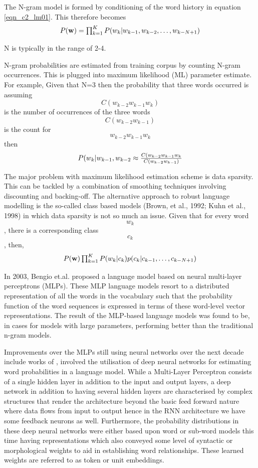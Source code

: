 The N-gram model is formed by conditioning of the word history in equation \ref{eqn_c2_lm01}.  This therefore becomes
\begin{equation}$$P(\mathbf{w})=\prod_{k=1}^KP(w_k|w_{k-1},w_{k-2},\dots,w_{k-N+1})$$
\label{eqn_c2_lm02}
\end{equation}

N is typically in the range of 2-4.

N-gram probabilities are estimated from training corpus by counting N-gram occurrences.  This is plugged into maximum likelihood (ML) parameter estimate. For example, Given that N=3 then the probability that three words occurred is assuming $$C(w_{k-2}w_{k-1}w_k)$$ is the number of occurrences of the three words $$C(w_{k-2}w_{k-1})$$ is the count for $$w_{k-2}w_{k-1}w_k$$ then
\begin{equation}
$$P(w_k|w_{k-1},w_{k-2}\approx\frac{C(w_{k-2}w_{k-1}w_k}{C(w_{k-2}w_{k-1})}$$
\label{eqn_c2_lm03}
\end{equation}

The major problem with maximum likelihood estimation scheme is data sparsity. This can be tackled by a combination of smoothing techniques involving discounting and backing-off.  The alternative approach to robust language modelling is the so-called class based models (Brown, et al., 1992; Kuhn et al., 1998) in which data sparsity is not so much an issue. Given that for every word $$w_k$$, there is a corresponding class $$c_k$$, then,
\begin{equation}
$$P(\mathbf{w})\prod_{k=1}^KP(w_k|c_k)p(c_k|c_{k-1},\dots,c_{k-N+1})$$
\label{eqn_c2_lm04}
\end{equation}

In 2003, Bengio et.al. \cite{bengio2003neural} proposed a language model based on neural multi-layer perceptrons (MLPs). These MLP language models resort to a distributed representation of all the words in the vocabulary such that the probability function of the word sequences is expressed in terms of these word-level vector representations. The result of the MLP-based language models was found to be, in cases for models with large parameters, performing better than the traditional n-gram models.

Improvements over the MLPs still using neural networks over the next decade include works of \cite{mikolov2011empirical,sutskever2014sequence,luong2013better}, involved the utilisation of deep neural networks for estimating word probabilities in a language model.  While a Multi-Layer Perceptron consists of a single hidden layer in addition to the input and output layers, a deep network in addition to having several hidden layers are characterised by complex structures that render the architecture beyond the basic feed forward nature where data flows from input to output hence in the RNN architecture we have some feedback neurons as well.  Furthermore, the probability distributions in these deep neural networks were either based upon word or sub-word models this time having representations which also conveyed some level of syntactic or morphological weights to aid in establishing word relationships.  These learned weights are referred to as token or unit embeddings.

